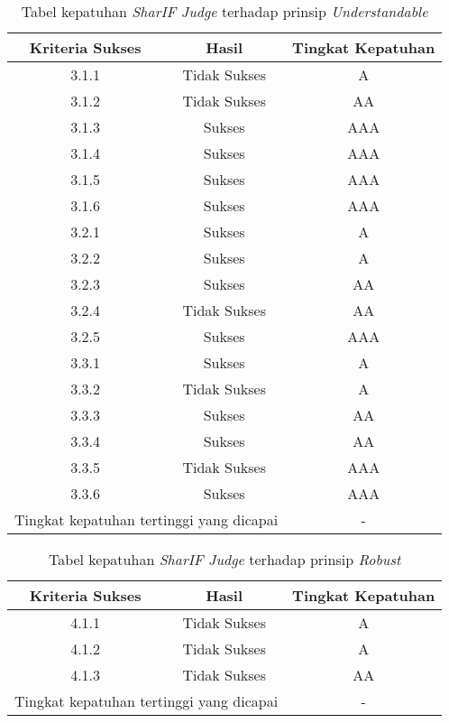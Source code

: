 \begin{table}[H]
	\centering
	\caption{Tabel kepatuhan \textit{SharIF Judge} terhadap prinsip \textit{Understandable}}
	\label{tab:kepatuhan_sharif_judge_understandable}
	\begin{tabular}{|c|c|c|}
		\hline
		Kriteria Sukses & Hasil & Tingkat Kepatuhan \\
		\hline
		\rowcolor{Pink} 3.1.1 & Tidak Sukses & A\\
		\rowcolor{LightRed} 3.1.2 & Tidak Sukses & AA\\
		3.1.3 & Sukses & AAA\\
		3.1.4 & Sukses & AAA\\
		3.1.5 & Sukses & AAA\\
		3.1.6 & Sukses & AAA\\
		3.2.1 & Sukses & A\\
		3.2.2 & Sukses & A\\
		3.2.3 & Sukses & AA\\
		\rowcolor{LightRed} 3.2.4 & Tidak Sukses & AA\\
		3.2.5 & Sukses & AAA\\
		3.3.1 & Sukses & A\\
		\rowcolor{Pink} 3.3.2 & Tidak Sukses & A\\
		3.3.3 & Sukses & AA\\
		3.3.4 & Sukses & AA\\
		\rowcolor{Red} 3.3.5 & Tidak Sukses & AAA\\
		3.3.6 & Sukses & AAA\\
		\hline
		\multicolumn{2}{|c|}{Tingkat kepatuhan tertinggi yang dicapai} & - \\
		\hline
	\end{tabular}
\end{table}

\begin{table}[H]
	\centering
	\caption{Tabel kepatuhan \textit{SharIF Judge} terhadap prinsip \textit{Robust}}
	\label{tab:kepatuhan_sharif_judge_robust}
	\begin{tabular}{|c|c|c|}
		\hline
		Kriteria Sukses & Hasil & Tingkat Kepatuhan \\
		\hline
		\rowcolor{Pink} 4.1.1 & Tidak Sukses & A\\
		\rowcolor{Pink} 4.1.2 & Tidak Sukses & A\\
		\rowcolor{LightRed} 4.1.3 & Tidak Sukses & AA\\
		\hline
		\multicolumn{2}{|c|}{Tingkat kepatuhan tertinggi yang dicapai} & - \\
		\hline
	\end{tabular}
\end{table}

